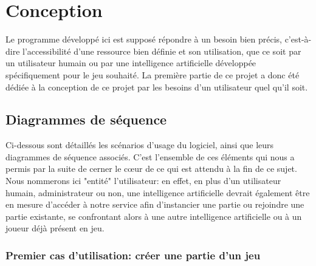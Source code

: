 \chapter{Conception}

Le programme développé ici est supposé répondre à un besoin bien précis, c'est-à-dire l'accessibilité d'une ressource bien définie et son utilisation, que ce soit par un utilisateur humain ou par une intelligence artificielle développée spécifiquement pour le jeu souhaité. La première partie de ce projet a donc été dédiée à la conception de ce projet par les besoins d'un utilisateur quel qu'il soit.\\

\section{Diagrammes de séquence}

Ci-dessous sont détaillés les scénarios d'usage du logiciel, ainsi que leurs diagrammes de séquence associés. C'est l'ensemble de ces éléments qui nous a permis par la suite de cerner le cœur de ce qui est attendu à la fin de ce sujet.\\

Nous nommerons ici "entité" l'utilisateur: en effet, en plus d'un utilisateur humain, administrateur ou non, une intelligence artificielle devrait également être en mesure d'accéder à notre service afin d'instancier une partie ou rejoindre une partie existante, se confrontant alors à une autre intelligence artificielle ou à un joueur déjà présent en jeu.

\newpage
\subsection{Premier cas d'utilisation: créer une partie d'un jeu}	
	
